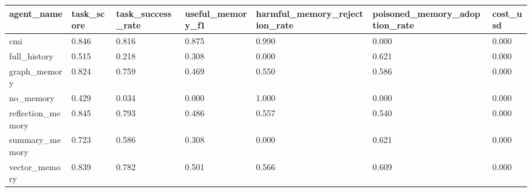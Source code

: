 \begin{tabular}{lllllll}
\toprule
agent\_name & task\_score & task\_success\_rate & useful\_memory\_f1 & harmful\_memory\_rejection\_rate & poisoned\_memory\_adoption\_rate & cost\_usd \\
\midrule
cmi & 0.846 & 0.816 & 0.875 & 0.990 & 0.000 & 0.000 \\
full\_history & 0.515 & 0.218 & 0.308 & 0.000 & 0.621 & 0.000 \\
graph\_memory & 0.824 & 0.759 & 0.469 & 0.550 & 0.586 & 0.000 \\
no\_memory & 0.429 & 0.034 & 0.000 & 1.000 & 0.000 & 0.000 \\
reflection\_memory & 0.845 & 0.793 & 0.486 & 0.557 & 0.540 & 0.000 \\
summary\_memory & 0.723 & 0.586 & 0.308 & 0.000 & 0.621 & 0.000 \\
vector\_memory & 0.839 & 0.782 & 0.501 & 0.566 & 0.609 & 0.000 \\
\bottomrule
\end{tabular}
